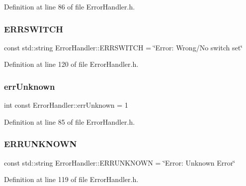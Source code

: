 Definition at line 86 of file Error\+Handler.\+h.

\mbox{\label{classErrorHandler_a7d2d47caa057173f4a55e92fd62e9fb8}} 
\subsubsection{\texorpdfstring{ERRSWITCH}{ERRSWITCH}}
{\footnotesize\ttfamily const std\+::string Error\+Handler\+::\+E\+R\+R\+S\+W\+I\+T\+CH = \char`\"{}Error\+: Wrong/No switch set\char`\"{}\hspace{0.3cm}{\ttfamily [static]}}



Definition at line 120 of file Error\+Handler.\+h.

\mbox{\label{classErrorHandler_a51e373250da346a49522dfdb99ddc1b3}} 
\subsubsection{\texorpdfstring{errUnknown}{errUnknown}}
{\footnotesize\ttfamily int const Error\+Handler\+::err\+Unknown = 1\hspace{0.3cm}{\ttfamily [static]}}



Definition at line 85 of file Error\+Handler.\+h.

\mbox{\label{classErrorHandler_a9530db091517e099bc9bad620390c31d}} 
\subsubsection{\texorpdfstring{ERRUNKNOWN}{ERRUNKNOWN}}
{\footnotesize\ttfamily const std\+::string Error\+Handler\+::\+E\+R\+R\+U\+N\+K\+N\+O\+WN = \char`\"{}Error\+: Unknown Error\char`\"{}\hspace{0.3cm}{\ttfamily [static]}}



Definition at line 119 of file Error\+Handler.\+h.

\mbox{\label{classErrorHandler_ad1dc2ca6c4b226730361cc8d7b786e30}} 
